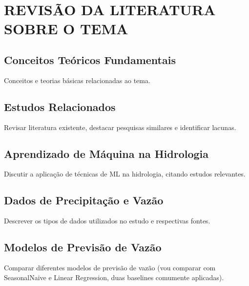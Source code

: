 \chapter{REVIS\~AO DA LITERATURA SOBRE O TEMA}
\section{Conceitos Teóricos Fundamentais}
Conceitos e teorias básicas relacionadas ao tema.

\section{Estudos Relacionados}
Revisar literatura existente, destacar pesquisas similares e identificar lacunas.

\section{Aprendizado de Máquina na Hidrologia}
Discutir a aplicação de técnicas de ML na hidrologia, citando estudos relevantes.

\section{Dados de Precipitação e Vazão}
Descrever os tipos de dados utilizados no estudo e respectivas fontes.

\section{Modelos de Previsão de Vazão}
Comparar diferentes modelos de previsão de vazão (vou comparar com SeasonalNaive e Linear Regression, duas baselines comumente aplicadas).